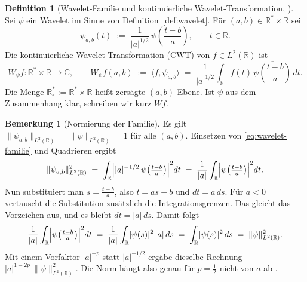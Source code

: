 \documentclass[a4paper,11pt,bibliography=totoc,listof=totoc,headinclude=true,cleardoublepage=empty,oneside]{scrbook}
\theoremstyle{plain}
\theoremstyle{definition}
\newtheorem{Definition}[Satz]{Definition}
\newtheorem{Bemerkung}[Satz]{Bemerkung}
\newcommand{\R}{\mathbb{R}}
\newcommand{\C}{\mathbb{C}}
\newcommand{\LZwei}{L^2(\R)}
\newcommand{\scal}[2]{\langle #1, #2 \rangle}
\newcommand{\norm}[1]{\lVert #1 \rVert}
\begin{document}
\begin{Definition}[Wavelet-Familie und kontinuierliche Wavelet-Transformation, {\cite[Kap.~3.1, Gl.~(4)--(6)]{blatter}}] %
\label{def:cwt}
Sei $\psi$ ein Wavelet im Sinne von Definition~\ref{def:wavelet}. Für
$(a,b) \in \R^* \times \R$ sei
\begin{equation}
\label{eq:wavelet-familie}
  \psi_{a,b}(t) \;:=\; \frac{1}{\lvert a\rvert^{1/2}}\,\psi\!\left(\frac{t-b}{a}\right),
  \qquad t \in \R .
\end{equation}
Die kontinuierliche Wavelet-Transformation (CWT) von $f \in \LZwei$ ist
\begin{equation}
\label{eq:cwt}
  W_\psi f \colon \R^*\times\R \to \C, \qquad
  W_\psi f(a,b) \;:=\; \scal{f}{\psi_{a,b}}
  \;=\; \frac{1}{\lvert a\rvert^{1/2}} \int_\R f(t)\,\overline{\psi\!\left(\frac{t-b}{a}\right)}\,dt .
\end{equation}
Die Menge $\R^*_\square := \R^*\times\R$ hei\ss{}t zersägte $(a,b)$-Ebene. Ist
$\psi$ aus dem Zusammenhang klar, schreiben wir kurz $Wf$.
\end{Definition}

 
\begin{Bemerkung}[Normierung der Familie]
\label{bem:normierung}
Es gilt $\norm{\psi_{a,b}}_{\LZwei} = \norm{\psi}_{\LZwei} = 1$ für alle
$(a,b)$. Einsetzen von \eqref{eq:wavelet-familie} und Quadrieren ergibt
\[
  \norm{\psi_{a,b}}_{\LZwei}^2
  \;=\; \int_\R \Bigl\lvert \lvert a\rvert^{-1/2}\,\psi\!\left(\tfrac{t-b}{a}\right)\Bigr\rvert^2 dt
  \;=\; \frac{1}{\lvert a\rvert}\int_\R \Bigl\lvert\psi\!\left(\tfrac{t-b}{a}\right)\Bigr\rvert^2 dt .
\]
Nun substituiert man $s = \frac{t-b}{a}$, also $t = as + b$ und $dt = a\,ds$.
Für $a < 0$ vertauscht die Substitution zusätzlich die Integrationsgrenzen. Das
gleicht das Vorzeichen aus, und es bleibt $dt = \lvert a\rvert\,ds$. Damit folgt
\[
  \frac{1}{\lvert a\rvert}\int_\R \Bigl\lvert\psi\!\left(\tfrac{t-b}{a}\right)\Bigr\rvert^2 dt
  \;=\; \frac{1}{\lvert a\rvert}\int_\R \lvert\psi(s)\rvert^2\,\lvert a\rvert\,ds
  \;=\; \int_\R \lvert\psi(s)\rvert^2\,ds
  \;=\; \norm{\psi}_{\LZwei}^2 .
\]
Mit einem Vorfaktor $\lvert a\rvert^{-p}$ statt $\lvert a\rvert^{-1/2}$ ergäbe
dieselbe Rechnung $\lvert a\rvert^{1-2p}\,\norm{\psi}_{\LZwei}^2$. Die Norm
hängt also genau für $p = \tfrac12$ nicht von $a$ ab \cite[Kap.~3.1]{blatter}. %
\end{Bemerkung}
 
\end{document}
